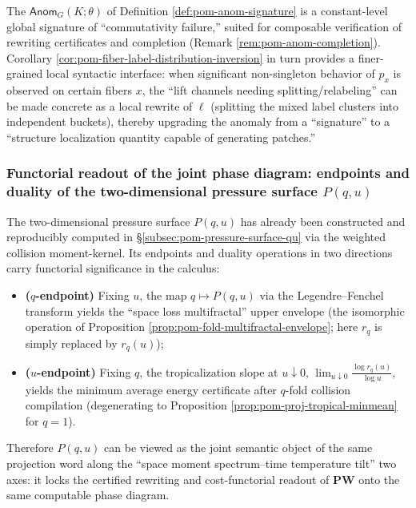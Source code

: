 \begin{remark}\label{rem:pom-anom-localization-bridge}
The \(\mathsf{Anom}_G(K;\theta)\) of Definition \ref{def:pom-anom-signature} is a constant-level global signature of ``commutativity failure,'' suited for composable verification of rewriting certificates and completion (Remark \ref{rem:pom-anom-completion}).
Corollary \ref{cor:pom-fiber-label-distribution-inversion} in turn provides a finer-grained local syntactic interface: when significant non-singleton behavior of \(p_x\) is observed on certain fibers \(x\), the ``lift channels needing splitting/relabeling'' can be made concrete as a local rewrite of \(\ell\) (splitting the mixed label clusters into independent buckets), thereby upgrading the anomaly from a ``signature'' to a ``structure localization quantity capable of generating patches.''
\end{remark}
\subsubsection{Functorial readout of the joint phase diagram: endpoints and duality of the two-dimensional pressure surface \texorpdfstring{$P(q,u)$}{P(q,u)}}\label{subsec:pom-joint-phase-functor}
The two-dimensional pressure surface \(P(q,u)\) has already been constructed and reproducibly computed in \S\ref{subsec:pom-pressure-surface-qu} via the weighted collision moment-kernel.
Its endpoints and duality operations in two directions carry functorial significance in the calculus:
\begin{itemize}
  \item \textbf{(\(q\)-endpoint)} Fixing \(u\), the map \(q\mapsto P(q,u)\) via the Legendre--Fenchel transform yields the ``space loss multifractal'' upper envelope (the isomorphic operation of Proposition \ref{prop:pom-fold-multifractal-envelope}; here \(r_q\) is simply replaced by \(r_q(u)\));
  \item \textbf{(\(u\)-endpoint)} Fixing \(q\), the tropicalization slope at \(u\downarrow 0\),
  \(
  \lim_{u\downarrow 0}\frac{\log r_q(u)}{\log u}
  \),
  yields the minimum average energy certificate after \(q\)-fold collision compilation (degenerating to Proposition \ref{prop:pom-proj-tropical-minmean} for \(q=1\)).
\end{itemize}
Therefore \(P(q,u)\) can be viewed as the joint semantic object of the same projection word along the ``space moment spectrum--time temperature tilt'' two axes: it locks the certified rewriting and cost-functorial readout of \(\mathbf{PW}\) onto the same computable phase diagram.










